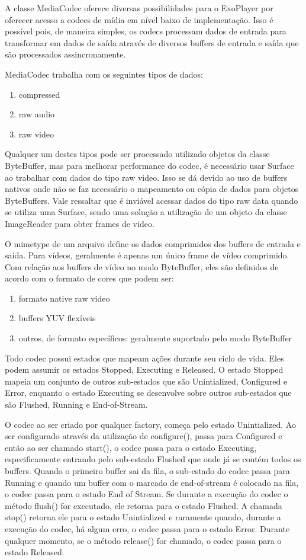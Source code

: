 \documentclass[sigconf]{acmart}
\begin{document}
A classe MediaCodec oferece diversas possibilidades para o ExoPlayer por oferecer acesso a codecs de mídia em nível baixo de implementação. Isso é possível pois, de maneira simples, os codecs processam dados de entrada para transformar em dados de saída através de diversos buffers de entrada e saída que são processados assincronamente.

MediaCodec trabalha com os seguintes tipos de dados:

\begin{enumerate}
    \item compressed
    \item raw audio
    \item raw video
\end{enumerate}

Qualquer um destes tipos pode ser processado utilizado objetos da classe ByteBuffer, mas para melhorar performance do codec, é necessário usar Surface ao trabalhar com dados do tipo raw video. Isso se dá devido ao uso de buffers nativos onde não se faz necessário o mapeamento ou cópia de dados para objetos ByteBuffers. Vale ressaltar que é inviável acessar dados do tipo raw data quando se utiliza uma Surface, sendo uma solução a utilização de um objeto da classe ImageReader para obter frames de video.

O mimetype de um arquivo define os dados comprimidos dos buffers de entrada e saída. Para vídeos, geralmente é apenas um único frame de vídeo comprimido. Com relação aos buffers de vídeo no modo ByteBuffer, eles são definidos de acordo com o formato de cores que podem ser:

\begin{enumerate}
    \item formato native raw video
    \item buffers YUV flexíveis
    \item outros, de formato específicos: geralmente suportado pelo modo ByteBuffer
\end{enumerate}


Todo codec possui estados que mapeam ações durante seu ciclo de vida. Eles podem assumir os estados Stopped, Executing e Released. O estado Stopped mapeia um conjunto de outros sub-estados que são Unintialized, Configured e Error, enquanto o estado Executing se desenvolve sobre outros sub-estados que são Flushed, Running e End-of-Stream.

O codec ao ser criado por qualquer factory, começa pelo estado Unintialized. Ao ser configurado através da utilização de configure(), passa para Configured e então ao ser chamado start(), o codec passa para o estado Executing, especificamente entrando pelo sub-estado Flushed que onde já se contém todos os buffers. Quando o primeiro buffer sai da fila, o sub-estado do codec passa para Running e quando um buffer com o marcado de end-of-stream é colocado na fila, o codec passa para o estado End of Stream. Se durante a execução do codec o método flush() for executado, ele retorna para o estado Flushed. A chamada stop() retorna ele para o estado Unintialized e raramente quando, durante a execução do codec, há algum erro, o codec passa para o estado Error. Durante qualquer momento, se o método release() for chamado, o codec passa para o estado Released.
\end{document}
